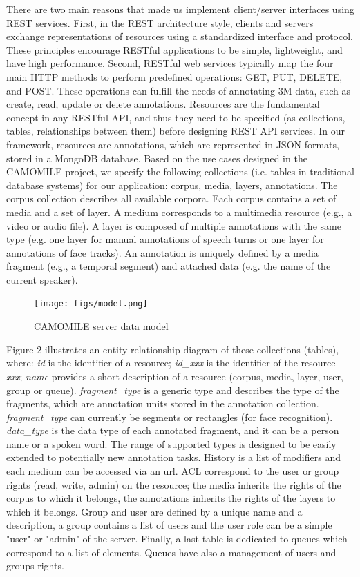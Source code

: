 \documentclass[10pt, a4paper]{article}
\begin{document}
There are two main reasons that made us implement client/server interfaces using REST services. First, in the REST architecture style, clients and servers exchange representations of resources using a standardized interface and protocol. These principles encourage RESTful applications to be simple, lightweight, and have high performance. Second, RESTful web services typically map the four main HTTP methods to perform predefined operations: GET, PUT, DELETE, and POST. These operations can fulfill the needs of annotating 3M data, such as create, read, update or delete annotations.
Resources are the fundamental concept in any RESTful API, and thus they need to be specified (as collections, tables, relationships between them) before designing REST API services. In our framework, resources are annotations, which are represented in JSON formats, stored in a MongoDB database. Based on the use cases designed in the CAMOMILE project, we specify the following collections (i.e. tables in traditional database systems) for our application: corpus, media, layers, annotations. The corpus collection describes all available corpora. Each corpus contains a set of media and a set of layer. A medium corresponds to a multimedia resource (e.g., a video or audio file). A layer is composed of multiple annotations with the same type (e.g. one layer for manual annotations of speech turns or one layer for annotations of face tracks). An annotation is uniquely defined by a media fragment (e.g., a temporal segment) and attached data (e.g. the name of the current speaker).

\begin{figure}[htb]
 \center 
 \texttt{[image: figs/model.png]}
 \centering
 \caption {CAMOMILE server data model}
 \label{fig:model}
\end{figure}

Figure 2 illustrates an entity-relationship diagram of these collections (tables), where: \textit{id} is the identifier of a resource; \textit{id\_xxx} is the identifier of the resource \textit{xxx}; \textit{name} provides a short description of a resource (corpus, media, layer, user, group or queue). \textit{fragment\_type} is a generic type and describes the type of the fragments, which are annotation units stored in the annotation collection. \textit{fragment\_type} can currently be segments or rectangles (for face recognition). \textit{data\_type} is the data type of each annotated fragment, and it can be a person name or a spoken word. The range of supported types is designed to be easily extended to potentially new annotation tasks. History is a list of modifiers and each medium can be accessed via an url. ACL correspond to the user or group rights (read, write, admin) on the resource; the media inherits the rights of the corpus to which it belongs, the annotations inherits the rights of the layers to which it belongs. Group and user are defined by a unique name and a description, a group contains a list of users and the user role can be a simple "user" or "admin" of the server. Finally, a last table is dedicated to queues which correspond to a list of elements. Queues have also a management of users and groups rights.
\end{document}
